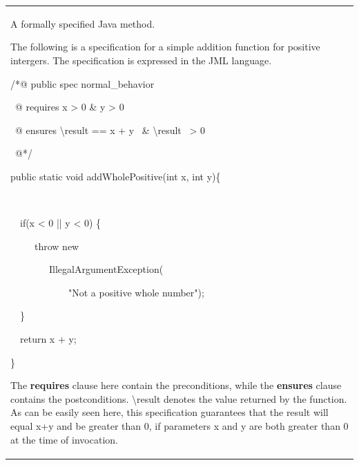 \documentclass{article}
\newcommand{\tmtextbf}[1]{{\bfseries{#1}}}
\newenvironment{tmparmod}[3]{\begin{list}{}{\setlength{\topsep}{0pt}\setlength{\leftmargin}{#1}\setlength{\rightmargin}{#2}\setlength{\parindent}{#3}\setlength{\listparindent}{\parindent}\setlength{\itemindent}{\parindent}\setlength{\parsep}{\parskip}} \item[]}{\end{list}}
\begin{document}
\begin{tmparmod}{1cm}{0pt}{0pt}
  \begin{tmparmod}{0pt}{1cm}{0pt}
    {\noindent}{\noindent}\begin{tabular}{l}
      \begin{example}
        A formally specified Java method.
        
        
        
        The following is a specification for a simple addition function for
        positive intergers. The specification is expressed in the JML
        language.
        
        
        
        \begin{tmparmod}{1cm}{0pt}{0pt}
          /*@ public spec normal\_behavior
          
          \ @ requires x > 0 \& y > 0
          
          \ @ ensures {\textbackslash}result == x + y \ \&
          {\textbackslash}result \ > 0
          
          \ @*/
          
          public static void addWholePositive(int x, int y)\{
          
          \ \
          
          \ \ if(x < 0 || y < 0) \{
          
          \ \ \ \ \ throw new
          
          \ \ \ \ \ \ \ \ IllegalArgumentException(
          
          \ \ \ \ \ \ \ \ \ \ \ \ "Not a positive whole number");
          
          \ \ \}
          
          
          
          \ \ return x + y;
          
          \}
        \end{tmparmod}
        
        
        
        The \tmtextbf{requires} clause here contain the preconditions, while
        the \tmtextbf{ensures} clause contains the postconditions.
        {\textbackslash}result denotes the value returned by the function. As
        can be easily seen here, this specification guarantees that the result
        will equal x+y and be greater than 0, if parameters x and y are both
        greater than 0 at the time of invocation.
      \end{example}
    \end{tabular}{\hspace*{\fill}}{\smallskip}
  \end{tmparmod}
\end{tmparmod}
\end{document}
